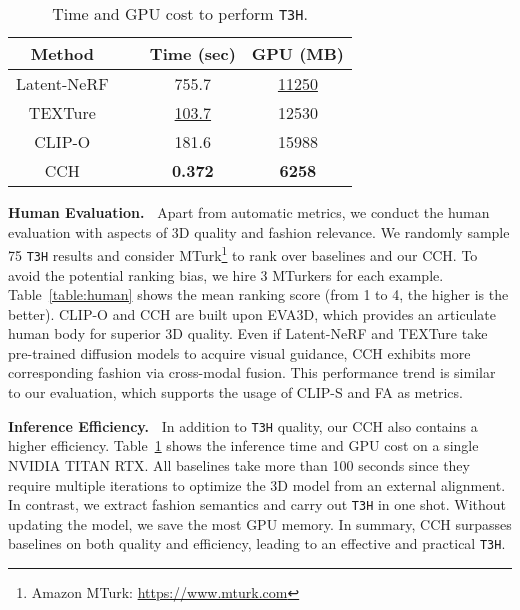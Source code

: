 \documentclass[11pt]{article}
\newcommand{\tablestyle}[2]{\setlength{\tabcolsep}{#1}\renewcommand{\arraystretch}{#2}\centering\footnotesize}
\begin{document}
\begin{table}[t]
\centering \tablestyle{5pt}{1.1}
    \begin{tabular}{cccc}
        \toprule
        Method & ~ & Time (sec) & GPU (MB) \\
        \midrule
        Latent-NeRF & ~ & 755.7 & \underline{11250} \\
        TEXTure & ~ & \underline{103.7} & 12530 \\
        CLIP-O & ~ & 181.6 & 15988 \\
        CCH & ~ & \textbf{0.372} & \textbf{6258} \\
        \bottomrule
    \end{tabular}
    \vspace{-1.5ex}
    \caption{Time and GPU cost to perform \texttt{T3H}.}
    \label{table:efficiency}
    \vspace{-3ex}
\end{table}

\vspace{1ex} \noindent \textbf{Human Evaluation.~}
Apart from automatic metrics, we conduct the human evaluation with aspects of 3D quality and fashion relevance. We randomly sample 75 \texttt{T3H} results and consider MTurk\footnote{Amazon MTurk: \url{https://www.mturk.com}} to rank over baselines and our CCH. To avoid the potential ranking bias, we hire 3 MTurkers for each example. Table~\ref{table:human} shows the mean ranking score (from 1 to 4, the higher is the better). CLIP-O and CCH are built upon EVA3D, which provides an articulate human body for superior 3D quality. Even if Latent-NeRF and TEXTure take pre-trained diffusion models to acquire visual guidance, CCH exhibits more corresponding fashion via cross-modal fusion. This performance trend is similar to our evaluation, which supports the usage of CLIP-S and FA as metrics.

\vspace{1ex} \noindent \textbf{Inference Efficiency.~}
In addition to \texttt{T3H} quality, our CCH also contains a higher efficiency. Table~\ref{table:efficiency} shows the inference time and GPU cost on a single NVIDIA TITAN RTX. All baselines take more than 100 seconds since they require multiple iterations to optimize the 3D model from an external alignment. In contrast, we extract fashion semantics and carry out \texttt{T3H} in one shot. Without updating the model, we save the most GPU memory. In summary, CCH surpasses baselines on both quality and efficiency, leading to an effective and practical \texttt{T3H}.
\end{document}
